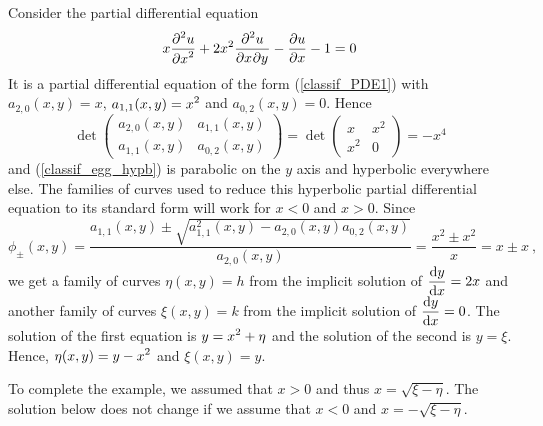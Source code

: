\begin{egg}
Consider the partial differential equation          \label{classif_egg_hyperb1}
\begin{equation} \label{classif_egg_hypb}
x \pdydxn{u}{x}{2} + 2 x^2 \pdydxnm{u}{x}{y}{2}{}{} - \pdydx{u}{x} - 1
= 0
\end{equation}
It is a partial differential equation of the form (\ref{classif_PDE1}) with
$a_{2,0}(x,y) = x$, $\DS a_{1,1}(x,y) = x^2$ and $a_{0,2}(x,y) = 0$.
Hence
\[
\det \begin{pmatrix}
a_{2,0}(x,y) & a_{1,1}(x,y) \\
a_{1,1}(x,y) & a_{0,2}(x,y)  
\end{pmatrix}
=
\det \begin{pmatrix}
x & x^2 \\
x^2 & 0  
\end{pmatrix}
=-x^4
\]
and (\ref{classif_egg_hypb}) is parabolic on the $y$ axis and
hyperbolic everywhere else.  The families of curves used to reduce this
hyperbolic partial differential equation to its standard form will
work for $x<0$ and $x>0$.  Since
\[
\phi_{\pm}(x,y) = \frac{a_{1,1}(x,y) \pm
\sqrt{a_{1,1}^2(x,y)-a_{2,0}(x,y)a_{0,2}(x,y)}}{a_{2,0}(x,y)}
= \frac{x^2 \pm x^2}{x} = x \pm x \ ,
\]
we get a family of curves $\eta(x,y) = h$ from the implicit
solution of $\DS \dydx{y}{x} = 2x$ and another family of curves
$\xi(x,y) = k$ from the implicit solution of
$\DS \dydx{y}{x} = 0$.  The solution of the first equation
is $\DS y = x^2 + \eta$ and the solution of the second is
$y=\xi$.  Hence, $\DS \eta(x,y)=y-x^2$ and $\xi(x,y) = y$.

To complete the example, we assumed that $x>0$ and thus
$x=\sqrt{\xi-\eta}$.  The solution below does not change if we assume
that $x<0$ and $x= -\sqrt{\xi-\eta}$.


\end{egg}
